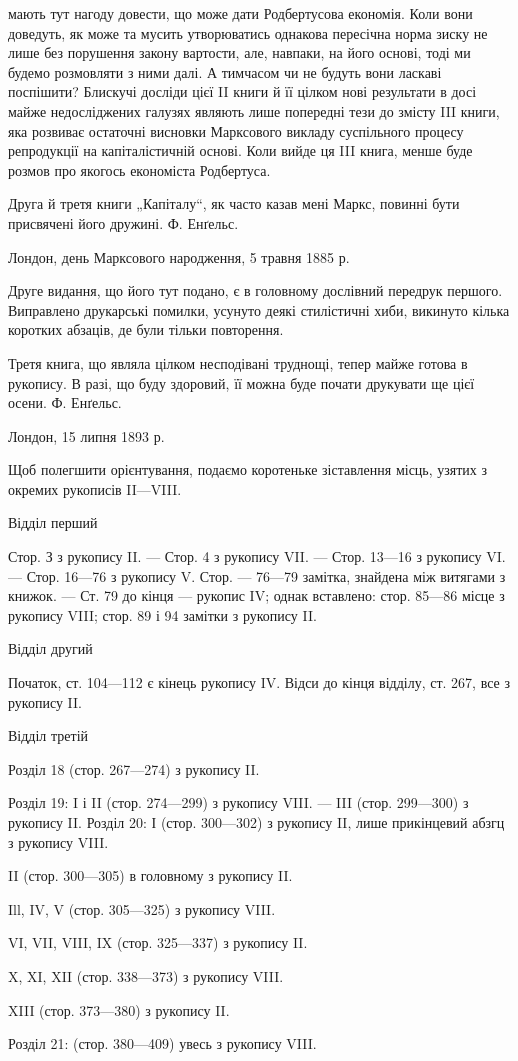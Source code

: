 \parcont{}  %
мають тут нагоду довести, що може дати Родбертусова економія. Коли
вони доведуть, як може та мусить утворюватись однакова пересічна
норма зиску не лише без порушення закону вартости, але, навпаки, на
його основі, тоді ми будемо розмовляти з ними далі. А тимчасом чи не
будуть вони ласкаві поспішити? Блискучі досліди цієї II книги й її цілком нові результати в досі
майже недосліджених галузях являють лише
попередні тези до змісту III книги, яка розвиває остаточні висновки Марксового
викладу суспільного процесу репродукції на капіталістичній
основі. Коли вийде ця III книга, менше буде розмов про якогось економіста
Родбертуса.

Друга й третя книги „Капіталу“, як часто казав мені Маркс, повинні
бути присвячені його дружині.
Ф. Енґельс.

Лондон, день Марксового народження, 5 травня 1885 р.

Друге видання, що його тут подано, є в головному дослівний передрук
першого. Виправлено друкарські помилки, усунуто деякі стилістичні
хиби, викинуто кілька коротких абзаців, де були тільки повторення.

Третя книга, що являла цілком несподівані труднощі, тепер майже
готова в рукопису. В разі, що буду здоровий, її можна буде почати
друкувати ще цієї осени. Ф. Енґельс.

Лондон, 15 липня 1893 р.

Щоб полегшити орієнтування, подаємо коротеньке зіставлення місць,
узятих з окремих рукописів II—VIII.

Відділ перший

Стор. З з рукопису II. — Стор. 4 з рукопису VII. — Стор. 13—16
з рукопису VI. — Стор. 16—76 з рукопису V. Стор. — 76—79 замітка, знайдена
між витягами з книжок. — Ст. 79 до кінця — рукопис IV; однак
вставлено: стор. 85—86 місце з рукопису VIII; стор. 89 і 94 замітки з
рукопису II.

Відділ другий

Початок, ст. 104—112 є кінець рукопису IV. Відси до кінця відділу,
ст. 267, все з рукопису II.

Відділ третій

Розділ 18 (стор. 267—274) з рукопису II.

Розділ 19: I і II (стор. 274—299) з рукопису VIII. — III (стор. 299—300)
з рукопису II.
Розділ 20: І (стор. 300—302) з рукопису II, лише прикінцевий
абзгц з рукопису VIII.

II (стор. 300—305) в головному з рукопису II.

Ill, IV, V (стор. 305—325) з рукопису VIII.

VI, VII, VIII, IX (стор. 325—337) з рукопису II.

X, XI, XII (стор. 338—373) з рукопису VIII.

XIII (стор. 373—380) з рукопису II.

Розділ 21: (стор. 380—409) увесь з рукопису VIII.
\parbreak{}  %
